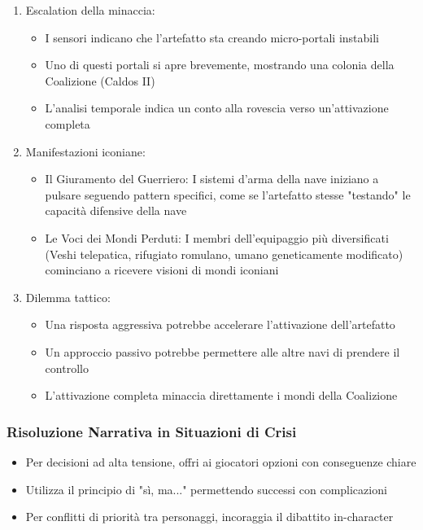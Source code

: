 \documentclass[letterpaper,twocolumn,openany,nodeprecatedcode]{dndbook}
\begin{document}
\begin{enumerate}
    \item Escalation della minaccia:
    \begin{itemize}
    \item I sensori indicano che l'artefatto sta creando micro-portali instabili
    \item Uno di questi portali si apre brevemente, mostrando una colonia della Coalizione (Caldos II)
    \item L'analisi temporale indica un conto alla rovescia verso un'attivazione completa
    \end{itemize}
    \item Manifestazioni iconiane:
    \begin{itemize}
    \item Il Giuramento del Guerriero: I sistemi d'arma della nave iniziano a pulsare seguendo pattern specifici, come se l'artefatto stesse "testando" le capacità difensive della nave
    \item Le Voci dei Mondi Perduti: I membri dell'equipaggio più diversificati (Veshi telepatica, rifugiato romulano, umano geneticamente modificato) cominciano a ricevere visioni di mondi iconiani
    \end{itemize}
    \item Dilemma tattico:
    \begin{itemize}
    \item Una risposta aggressiva potrebbe accelerare l'attivazione dell'artefatto
    \item Un approccio passivo potrebbe permettere alle altre navi di prendere il controllo
    \item L'attivazione completa minaccia direttamente i mondi della Coalizione
    \end{itemize}
\end{enumerate}




\subsubsection{Risoluzione Narrativa in Situazioni di Crisi}

\begin{itemize}
    \item Per decisioni ad alta tensione, offri ai giocatori opzioni con conseguenze chiare
    \item Utilizza il principio di "sì, ma..." permettendo successi con complicazioni
    \item Per conflitti di priorità tra personaggi, incoraggia il dibattito in-character
\end{itemize}
\end{document}
